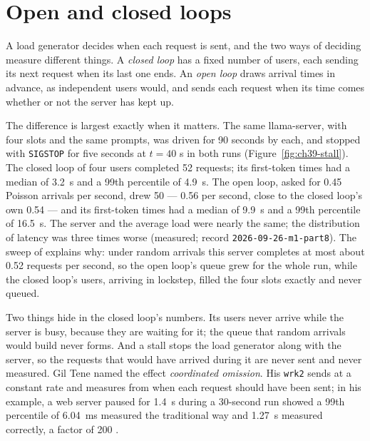 \section{Open and closed loops}

A load generator decides when each request is sent, and the two ways of
deciding measure different things. A \emph{closed loop} has a fixed number of
users, each sending its next request when its last one ends. An \emph{open loop}
draws arrival times in advance, as independent users would, and sends each
request when its time comes whether or not the server has kept up.

The difference is largest exactly when it matters. The same llama-server, with
four slots and the same prompts, was driven for 90 seconds by each, and stopped
with \texttt{SIGSTOP} for five seconds at $t = 40$ s in both runs
(Figure~\ref{fig:ch39-stall}). The closed loop of four users completed 52
requests; its first-token times had a median of 3.2~s and a 99th percentile of
4.9~s. The open loop, asked for 0.45 Poisson arrivals per second, drew 50 ---
0.56 per second, close to the closed loop's own 0.54 --- and its first-token times
had a median of 9.9~s and a 99th percentile of 16.5~s. The server and the average
load were nearly the same; the distribution of latency was three times worse
(measured; record \texttt{2026-09-26-m1-part8}). The sweep of 
explains why: under random arrivals this server completes at most about 0.52
requests per second, so the open loop's queue grew for the whole run, while the
closed loop's users, arriving in lockstep, filled the four slots exactly and
never queued.


Two things hide in the closed loop's numbers. Its users never arrive while the
server is busy, because they are waiting for it; the queue that random arrivals
would build never forms. And a stall stops the load generator along with the
server, so the requests that would have arrived during it are never sent and
never measured. Gil Tene named the effect \emph{coordinated omission}. His
\texttt{wrk2} sends at a constant rate and measures from when each request
should have been sent; in his example, a web server paused for 1.4~s during a
30-second run showed a 99th percentile of 6.04~ms measured the traditional way
and 1.27~s measured correctly, a factor of 200 \cite{tene2014wrk2}.

